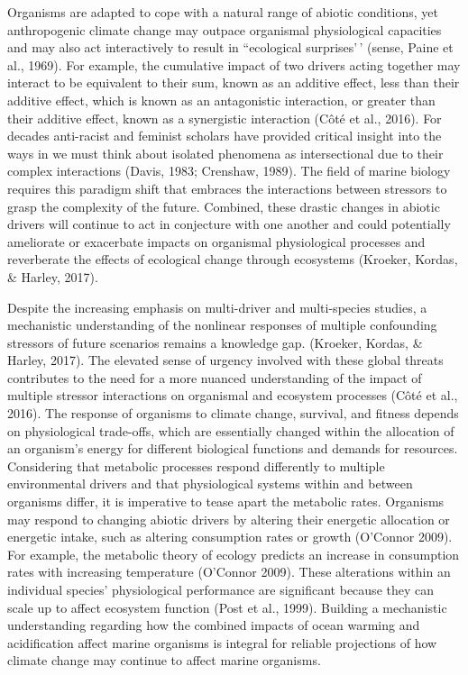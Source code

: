 \documentclass[
  11pt,
]{article}
\begin{document}
\begin{centering}
Organisms are adapted to cope with a natural range of abiotic
conditions, yet anthropogenic climate change may outpace organismal
physiological capacities and may also act interactively to result in
``ecological surprises'\,' (sense, Paine et al., 1969). For example, the
cumulative impact of two drivers acting together may interact to be
equivalent to their sum, known as an additive effect, less than their
additive effect, which is known as an antagonistic interaction, or
greater than their additive effect, known as a synergistic interaction
(Côté et al., 2016). For decades anti-racist and feminist scholars have
provided critical insight into the ways in we must think about isolated
phenomena as intersectional due to their complex interactions (Davis,
1983; Crenshaw, 1989). The field of marine biology requires this
paradigm shift that embraces the interactions between stressors to grasp
the complexity of the future. Combined, these drastic changes in abiotic
drivers will continue to act in conjecture with one another and could
potentially ameliorate or exacerbate impacts on organismal physiological
processes and reverberate the effects of ecological change through
ecosystems (Kroeker, Kordas, \& Harley, 2017).

Despite the increasing emphasis on multi-driver and multi-species
studies, a mechanistic understanding of the nonlinear responses of
multiple confounding stressors of future scenarios remains a knowledge
gap. (Kroeker, Kordas, \& Harley, 2017). The elevated sense of urgency
involved with these global threats contributes to the need for a more
nuanced understanding of the impact of multiple stressor interactions on
organismal and ecosystem processes (Côté et al., 2016). The response of
organisms to climate change, survival, and fitness depends on
physiological trade-offs, which are essentially changed within the
allocation of an organism's energy for different biological functions
and demands for resources. Considering that metabolic processes respond
differently to multiple environmental drivers and that physiological
systems within and between organisms differ, it is imperative to tease
apart the metabolic rates. Organisms may respond to changing abiotic
drivers by altering their energetic allocation or energetic intake, such
as altering consumption rates or growth (O'Connor 2009). For example,
the metabolic theory of ecology predicts an increase in consumption
rates with increasing temperature (O'Connor 2009). These alterations
within an individual species' physiological performance are significant
because they can scale up to affect ecosystem function (Post et al.,
1999). Building a mechanistic understanding regarding how the combined
impacts of ocean warming and acidification affect marine organisms is
integral for reliable projections of how climate change may continue to
affect marine organisms.


\end{centering}
\end{document}
